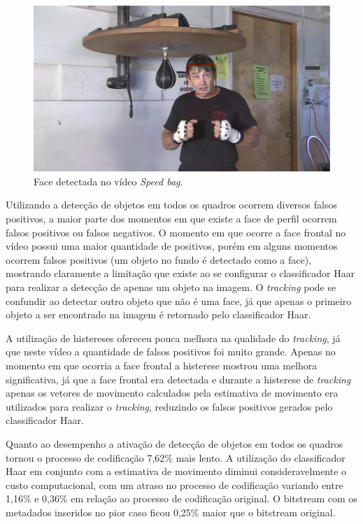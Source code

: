 \begin{figure}[H]
\centering
\includegraphics[scale=0.3]{imagens/fig26.eps}
\caption{Face detectada no vídeo \textit{Speed bag}.}
\label{fig:speed_bag_example}
\end{figure}

Utilizando a detecção de objetos em todos os quadros ocorrem diversos falsos positivos, a maior parte dos momentos em que existe a face de perfil ocorrem falsos positivos ou falsos negativos. O momento em que ocorre a face frontal no vídeo possui uma maior quantidade de positivos, porém em alguns momentos ocorrem falsos positivos (um objeto no fundo é detectado como a face), mostrando claramente a limitação que existe ao se configurar o classificador Haar para realizar a detecção de apenas um objeto na imagem. O \textit{tracking} pode se confundir ao detectar outro objeto que não é uma face, já que apenas o primeiro objeto a ser encontrado na imagem é retornado pelo classificador Haar. 

A utilização de histereses ofereceu pouca melhora na qualidade do \textit{tracking}, já que neste vídeo a quantidade de falsos positivos foi muito grande. Apenas no momento em que ocorria a face frontal a histerese mostrou uma melhora significativa, já que a face frontal era detectada e durante a histerese de \textit{tracking} apenas os vetores de movimento calculados pela estimativa de movimento era utilizados para realizar o \textit{tracking}, reduzindo os falsos positivos gerados pelo classificador Haar.

Quanto ao desempenho a ativação de detecção de objetos em todos os quadros tornou o processo de codificação 7,62\% mais lento. A utilização do classificador Haar em conjunto com a estimativa de movimento diminui consideravelmente o custo computacional, com um atraso no processo de codificação variando entre 1,16\% e 0,36\% em relação ao processo de codificação original. O bitstream com os metadados inseridos no pior caso ficou 0,25\% maior que o bitstream original.


